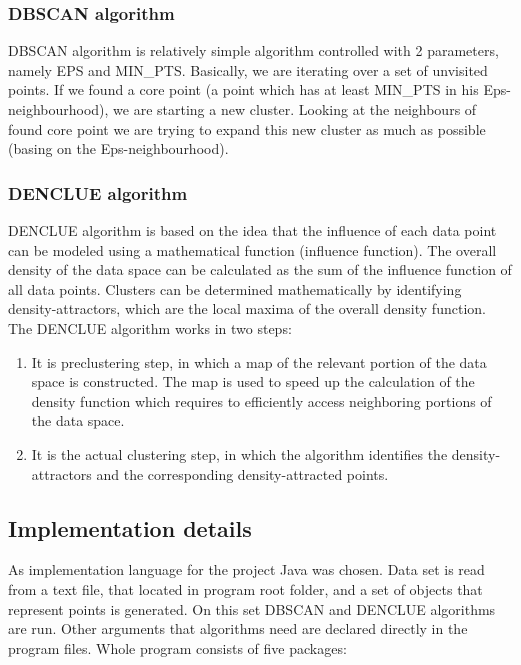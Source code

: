 \documentclass[12pt, a4paper, notitlepage, oneside]{article}
\begin{document}
\subsubsection*{DBSCAN algorithm}

DBSCAN algorithm is relatively simple algorithm controlled with 2 parameters, namely EPS and MIN\_PTS. \cite{dbscan}
Basically, we are iterating over a set of unvisited points. If we found a core point (a point which has
at least MIN\_PTS in his Eps-neighbourhood), we are starting a new cluster. Looking at the neighbours 
of found core point we are trying to expand this new cluster as much as possible (basing on the Eps-neighbourhood).



\subsubsection*{DENCLUE algorithm}

DENCLUE algorithm is based on the idea that the influence of each data point can be modeled using a mathematical function (influence function). The overall density of the data space can be calculated as the sum of the influence function of all data points. Clusters can be determined mathematically by identifying density-attractors, which are the local maxima of the overall density function. The DENCLUE algorithm works in two steps:

\begin{enumerate}
	\item It is preclustering step, in which a map of the relevant portion of the data space is constructed. The map is used to speed up the calculation of the density function which requires to efficiently access neighboring portions of the data space. 
	
	\item It is the actual clustering step, in which the algorithm identifies the density-attractors and the corresponding density-attracted points.
\end{enumerate}

\subsection*{Implementation details}

As implementation language for the project Java was chosen. 
Data set is read from a text file, that located in program root folder, and a set of objects that represent points is generated. 
On this set DBSCAN and DENCLUE algorithms are run. 
Other arguments that algorithms need are declared directly in the program files. Whole program consists of five packages:
\end{document}
